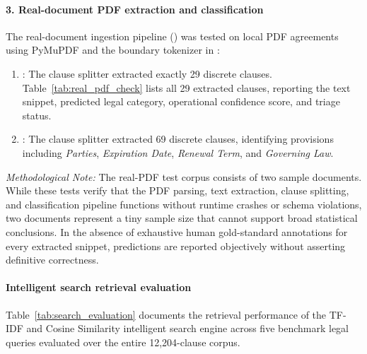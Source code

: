 \paragraph*{3. Real-document PDF extraction and classification}
The real-document ingestion pipeline () was tested on local PDF agreements using PyMuPDF and the boundary tokenizer in :
\begin{enumerate}
    \item {}: The clause splitter extracted exactly 29 discrete clauses. Table~\ref{tab:real_pdf_check} lists all 29 extracted clauses, reporting the text snippet, predicted legal category, operational confidence score, and triage status.
    \item {}: The clause splitter extracted 69 discrete clauses, identifying provisions including \textit{Parties}, \textit{Expiration Date}, \textit{Renewal Term}, and \textit{Governing Law}.
\end{enumerate}



\textit{Methodological Note:} The real-PDF test corpus consists of two sample documents. While these tests verify that the PDF parsing, text extraction, clause splitting, and classification pipeline functions without runtime crashes or schema violations, two documents represent a tiny sample size that cannot support broad statistical conclusions. In the absence of exhaustive human gold-standard annotations for every extracted snippet, predictions are reported objectively without asserting definitive correctness.

\paragraph*{Intelligent search retrieval evaluation}
Table~\ref{tab:search_evaluation} documents the retrieval performance of the TF-IDF and Cosine Similarity intelligent search engine across five benchmark legal queries evaluated over the entire 12,204-clause corpus.


